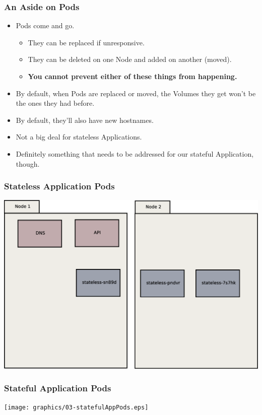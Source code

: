 \documentclass{beamer}
\begin{document}
\begin{frame}
    \frametitle{An Aside on Pods}
    \begin{itemize}
        \item Pods come and go.
        \begin{itemize}
            \item They can be replaced if unresponsive.
            \item They can be deleted on one Node and added on another (moved).
            \item \textbf{You cannot prevent either of these things from happening.}
        \end{itemize}
        \item By default, when Pods are replaced or moved, the Volumes they get won't be the ones they had before.
        \item By default, they'll also have new hostnames.
        \item Not a big deal for stateless Applications.
        \item Definitely something that needs to be addressed for our stateful Application, though.
    \end{itemize}
\end{frame}

\begin{frame}
    \frametitle{Stateless Application Pods}
    \includegraphics[width=\textwidth,height=0.85\textheight,keepaspectratio]{graphics/02-statelessAppPods.eps}
\end{frame}

\begin{frame}
    \frametitle{Stateful Application Pods}
    \texttt{[image: graphics/03-statefulAppPods.eps]}
\end{frame}
\end{document}
